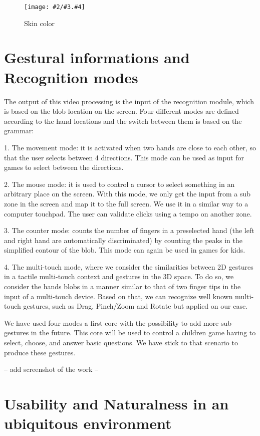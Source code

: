 \documentclass{llncs}
\newcommand\ignore[1]{}
\newcommand{\imagepathext}[5]{%
\begin{figure}[hbtp]
\hfil\texttt{[image: \#2/\#3.\#4]}\hfil
\caption{#5\label{#3}}
\end{figure}}
\newcommand{\png}[2]{\imagepathext{width=\columnwidth}{pics}{#1}{png}{#2}}
\begin{document}
\png{skincolor}{Skin color}

\ignore{
\section{Simplified gesture generation}
Using these blocks we are able to perturb
}

\section{Gestural informations and Recognition modes}
The output of this video processing is the input of the recognition module, which is based on the blob location on the screen. Four different modes are defined according to the hand locations and the switch between them is based on the grammar:

1. The movement mode:
it is activated when two hands are close to each other, so that the user selects between 4 directions. This mode can be used as input for games to select between the directions.

2. The mouse mode:
it is used to control a cursor to select something in an arbitrary place on the screen. With this mode, we only get the input from a sub zone in the screen and map it to the full screen. We use it in a similar way to a computer touchpad.
The user can validate clicks using a tempo on another zone.

3. The counter mode: counts the number of fingers in a preselected hand (the left and right hand are automatically discriminated) by counting the peaks in the simplified contour of the blob. This mode can again be used in games for kids.

4. The multi-touch mode, where we consider the similarities between 2D gestures in a tactile multi-touch context and gestures in the 3D space. To do so, we consider the hands blobs in a manner similar to that of two finger tips in the input of a multi-touch device. Based on that, we can recognize well known multi-touch gestures, such as Drag, Pinch/Zoom and Rotate but applied on our case.

We have used four modes a first core with the possibility to add more sub-gestures in the future.
This core will be used to control a children game having to select, choose, and answer basic questions.
We have stick to that scenario to produce these gestures. 

-- add screenshot of the work --

\section{Usability and Naturalness in an ubiquitous environment}
\end{document}
